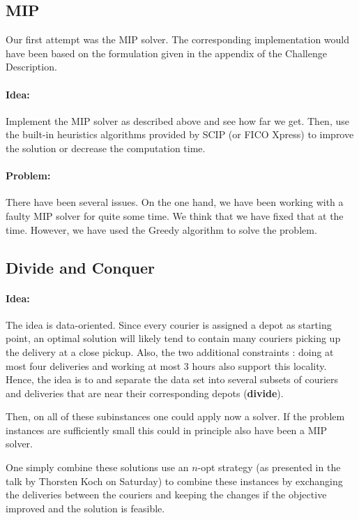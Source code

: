 \documentclass[a4paper]{article}
\begin{document}
\subsection{MIP}
Our first attempt was the MIP solver.
The corresponding implementation would have been based on the formulation given in the appendix of the Challenge Description.

\paragraph{Idea:}
Implement the MIP solver as described above and see how far we get.
Then, use the built-in heuristics algorithms provided by SCIP (or FICO Xpress) to improve the solution or decrease the computation time.

\paragraph{Problem:}
There have been several issues.
On the one hand, we have been working with a faulty MIP solver for quite some time.
We think that we have fixed that at the time.
However, we have used the Greedy algorithm to solve the problem.


\subsection{Divide and Conquer}
\paragraph{Idea:}
The idea is data-oriented.
Since every courier is assigned a depot as starting point, an optimal solution will likely tend to contain many couriers picking up the delivery at a close pickup.
Also, the two additional constraints : doing at most four deliveries and working at most 3 hours also support this locality.
Hence, the idea is to and separate the data set into several subsets of couriers and deliveries that are near their corresponding depots (\textbf{divide}).

Then, on all of these subinstances one could apply now a solver.
If the problem instances are sufficiently small this could in principle also have been a MIP solver.

One simply combine these solutions use an $n$-opt strategy (as presented in the talk by Thorsten Koch on Saturday) to combine these instances by exchanging the deliveries between the couriers and keeping the changes if the objective improved and the solution is feasible.
\end{document}
